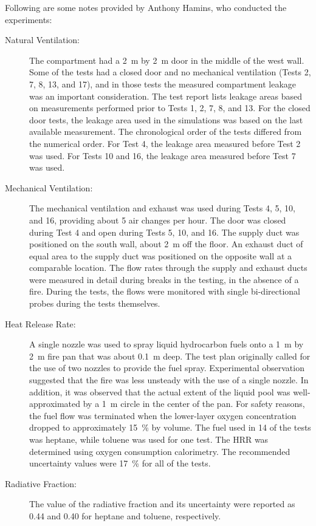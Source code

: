 Following are some notes provided by Anthony Hamins, who conducted the experiments:
\begin{description}
\item[Natural Ventilation:] The compartment had a 2~m by 2~m door in the middle of the west wall. Some of the tests had a closed door and no mechanical
ventilation (Tests 2, 7, 8, 13, and 17), and in those tests the measured compartment leakage was an important consideration. The test report lists leakage
areas based on measurements performed prior to Tests 1, 2, 7, 8, and 13. For the closed door tests, the leakage area used in the simulations was
based on the last available measurement. The chronological order of the tests differed from the numerical order.
For Test 4, the leakage area measured before Test 2 was used. For Tests 10 and 16, the leakage area
measured before Test 7 was used.
\item[Mechanical Ventilation:] The mechanical ventilation and exhaust was used during Tests 4, 5, 10, and 16, providing about 5 air changes per hour. The
door was closed during Test 4 and open during Tests 5, 10, and 16. The supply duct was positioned on the south wall, about 2~m off the floor. An
exhaust duct of equal area to the supply duct was positioned on the opposite wall at a comparable location. The flow rates through the supply and
exhaust ducts were measured in detail during breaks in the testing, in the absence of a fire. During the tests, the flows were monitored with single
bi-directional probes during the tests themselves.
\item[Heat Release Rate:] A single nozzle was used to spray liquid hydrocarbon fuels onto a 1~m by 2~m fire pan that was about 0.1~m deep. The test plan
originally called for the use of two nozzles to provide the fuel spray. Experimental observation suggested that the fire was less unsteady with the
use of a single nozzle. In addition, it was observed that the actual extent of the liquid pool was well-approximated by a 1~m circle in the
center of the pan. For safety reasons, the fuel flow was terminated when the lower-layer oxygen concentration
dropped to approximately 15~\% by volume.
The fuel used in 14 of the tests was heptane, while toluene was used for one test. The HRR was
determined using oxygen consumption calorimetry. The recommended uncertainty values
were 17~\% for all of the tests.
\item[Radiative Fraction:]  The value of the radiative fraction and its
uncertainty were reported as 0.44 and 0.40 for heptane and toluene, respectively.
\end{description}


